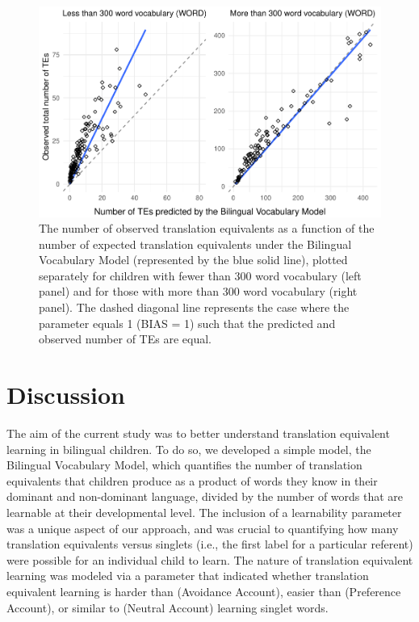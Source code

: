 \documentclass[
  english,
  ,man,floatsintext]{apa6}
\begin{document}
~

\begin{figure}

{\centering \includegraphics[width=1.2\linewidth]{paper_TE_bilingual_vocabulary_model_files/figure-latex/fig6-1} 

}

\caption{The number of observed translation equivalents as a function of the number of expected translation equivalents under the Bilingual Vocabulary Model (represented by the blue solid line), plotted separately for children with fewer than 300 word vocabulary (left panel) and for those with more than 300 word vocabulary (right panel). The dashed diagonal line represents the case where the parameter equals 1 (BIAS = 1) such that the predicted and observed number of TEs are equal.}\label{fig:fig6}
\end{figure}

\hypertarget{discussion}{%
\section{Discussion}\label{discussion}}

The aim of the current study was to better understand translation equivalent learning in bilingual children. To do so, we developed a simple model, the Bilingual Vocabulary Model, which quantifies the number of translation equivalents that children produce as a product of words they know in their dominant and non-dominant language, divided by the number of words that are learnable at their developmental level. The inclusion of a learnability parameter was a unique aspect of our approach, and was crucial to quantifying how many translation equivalents versus singlets (i.e., the first label for a particular referent) were possible for an individual child to learn. The nature of translation equivalent learning was modeled via a parameter that indicated whether translation equivalent learning is harder than (Avoidance Account), easier than (Preference Account), or similar to (Neutral Account) learning singlet words.
\end{document}
